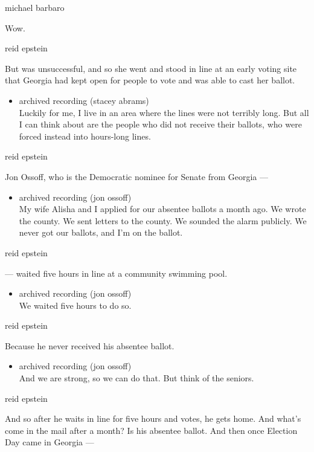 michael barbaro

Wow.

reid epstein

But was unsuccessful, and so she went and stood in line at an early
voting site that Georgia had kept open for people to vote and was able
to cast her ballot.

\begin{itemize}
\tightlist
\item
  archived recording (stacey abrams)\\
  Luckily for me, I live in an area where the lines were not terribly
  long. But all I can think about are the people who did not receive
  their ballots, who were forced instead into hours-long lines.
\end{itemize}

reid epstein

Jon Ossoff, who is the Democratic nominee for Senate from Georgia ---

\begin{itemize}
\tightlist
\item
  archived recording (jon ossoff)\\
  My wife Alisha and I applied for our absentee ballots a month ago. We
  wrote the county. We sent letters to the county. We sounded the alarm
  publicly. We never got our ballots, and I'm on the ballot.
\end{itemize}

reid epstein

--- waited five hours in line at a community swimming pool.

\begin{itemize}
\tightlist
\item
  archived recording (jon ossoff)\\
  We waited five hours to do so.
\end{itemize}

reid epstein

Because he never received his absentee ballot.

\begin{itemize}
\tightlist
\item
  archived recording (jon ossoff)\\
  And we are strong, so we can do that. But think of the seniors.
\end{itemize}

reid epstein

And so after he waits in line for five hours and votes, he gets home.
And what's come in the mail after a month? Is his absentee ballot. And
then once Election Day came in Georgia ---

